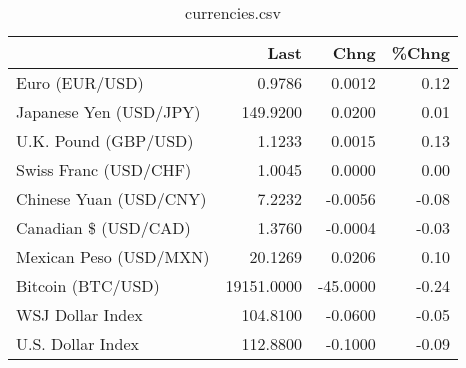 \documentclass{article}%
\begin{document}
%


\begin{table}[htbp]%
\caption{currencies.csv}%
\centering%
\begin{adjustbox}{width=1\textwidth}%
\begin{tabular}{lrrr}
\toprule
                       &       Last &     Chng &  \%Chng \\
\midrule
        Euro (EUR/USD) &     0.9786 &   0.0012 &   0.12 \\
Japanese Yen (USD/JPY) &   149.9200 &   0.0200 &   0.01 \\
  U.K. Pound (GBP/USD) &     1.1233 &   0.0015 &   0.13 \\
 Swiss Franc (USD/CHF) &     1.0045 &   0.0000 &   0.00 \\
Chinese Yuan (USD/CNY) &     7.2232 &  -0.0056 &  -0.08 \\
  Canadian \$ (USD/CAD) &     1.3760 &  -0.0004 &  -0.03 \\
Mexican Peso (USD/MXN) &    20.1269 &   0.0206 &   0.10 \\
     Bitcoin (BTC/USD) & 19151.0000 & -45.0000 &  -0.24 \\
      WSJ Dollar Index &   104.8100 &  -0.0600 &  -0.05 \\
     U.S. Dollar Index &   112.8800 &  -0.1000 &  -0.09 \\
\bottomrule
\end{tabular}
%
\end{adjustbox}%
\end{table}

%
\end{document}
